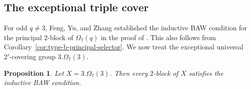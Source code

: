 \documentclass[10pt]{amsart}
\newtheorem{proposition}[theorem]{Proposition}
\theoremstyle{definition}
\numberwithin{equation}{section}
\numberwithin{table}{section}
\begin{document}
\subsection{The exceptional triple cover}
\label{subsec:type-b-rank-three}

For odd $q\ne3$, Feng, Yu, and Zhang established the inductive BAW
condition for the principal $2$-block of $\Omega_7(q)$ in the proof of
\cite[Corollary~5.17]{FengYuZhang2024}.  This also follows from
Corollary~\ref{cor:type-b-principal-selector}.  We now treat the exceptional
universal $2'$-covering group $3.\Omega_7(3)$.

\begin{proposition}\label{prop:type-b-q3}
Let $X=3.\Omega_7(3)$. Then every $2$-block of $X$ satisfies the inductive BAW
condition.
\end{proposition}
\end{document}
